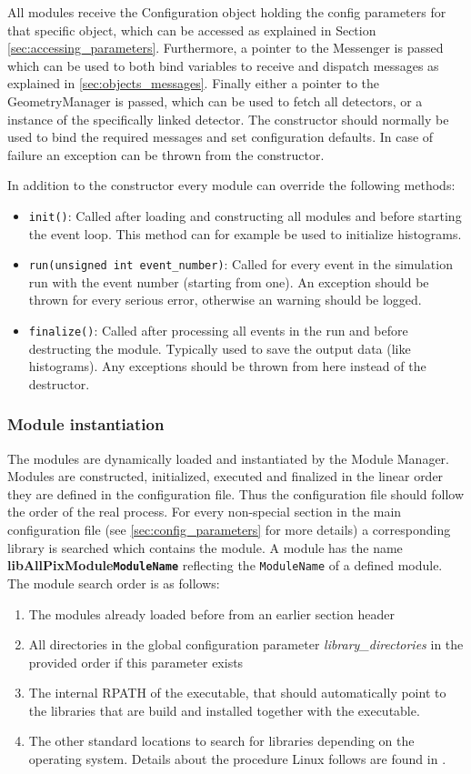 All modules receive the Configuration object holding the config parameters for that specific object, which can be accessed as explained in Section \ref{sec:accessing_parameters}. Furthermore, a pointer to the Messenger is passed which can be used to both bind variables to receive and dispatch messages as explained in \ref{sec:objects_messages}. Finally either a pointer to the GeometryManager is passed, which can be used to fetch all detectors, or a instance of the specifically linked detector. The constructor should normally be used to bind the required messages and set configuration defaults. In case of failure an exception can be thrown from the constructor. 

In addition to the constructor every module can override the following methods:
\begin{itemize}
\item \texttt{init()}: Called after loading and constructing all modules and before starting the event loop. This method can for example be used to initialize histograms.
\item \texttt{run(unsigned int event\_number)}: Called for every event in the simulation run with the event number (starting from one). An exception should be thrown for every serious error, otherwise an warning should be logged.
\item \texttt{finalize()}: Called after processing all events in the run and before destructing the module. Typically used to save the output data (like histograms). Any exceptions should be thrown from here instead of the destructor.
\end{itemize}

\subsubsection{Module instantiation}
\label{sec:module_instantiation}
The modules are dynamically loaded and instantiated by the Module Manager. Modules are constructed, initialized, executed and finalized in the linear order they are defined in the configuration file. Thus the configuration file should follow the order of the real process. For every non-special section in the main configuration file (see \ref{sec:config_parameters} for more details) a corresponding library is searched which contains the module. A module has the name \textbf{libAllPixModule\texttt{ModuleName}} reflecting the \texttt{ModuleName} of a defined module. The module search order is as follows:
\begin{enumerate}
\item The modules already loaded before from an earlier section header
\item All directories in the global configuration parameter \textit{library\_directories} in the provided order if this parameter exists
\item The internal RPATH of the executable, that should automatically point to the libraries that are build and installed together with the executable.
\item The other standard locations to search for libraries depending on the operating system. Details about the procedure Linux follows are found in \cite{linuxld}.
\end{enumerate}

